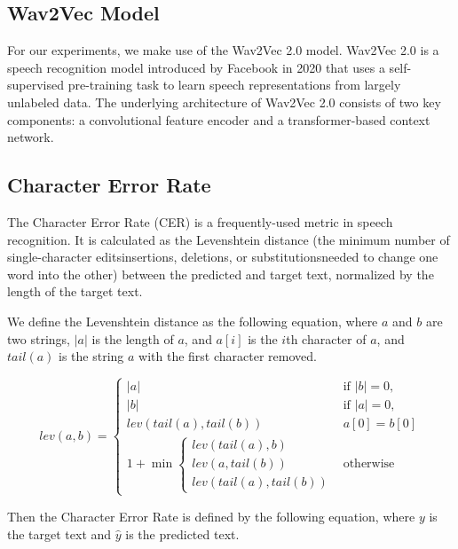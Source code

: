 \documentclass[11pt,a4paper]{article}
\begin{document}
\subsection{Wav2Vec Model}

For our experiments, we make use of the Wav2Vec 2.0 \cite{baevski2020wav2vec}
model. Wav2Vec 2.0 is a speech recognition model introduced by Facebook in 2020
that uses a self-supervised pre-training task to learn speech representations
from largely unlabeled data. The underlying architecture of Wav2Vec 2.0 consists
of two key components: a convolutional feature encoder and a transformer-based
context network.

\subsection{Character Error Rate}

The Character Error Rate (CER) is a frequently-used metric in speech
recognition. It is calculated as the Levenshtein distance (the minimum number of
single-character edits\textemdash insertions, deletions, or
substitutions\textemdash needed to change one word into the other) between the
predicted and target text, normalized by the length of the target text.

We define the Levenshtein distance as the following equation, where $a$ and $b$
are two strings, $|a|$ is the length of $a$, and $a[i]$ is the $i$th character of
$a$, and $tail(a)$ is the string $a$ with the first character removed.

\begin{equation}
  lev(a, b) = \left\{ \begin{array}{ll}
    |a| & \text{if } |b|=0, \\
    |b| & \text{if } |a|=0, \\
    lev(tail(a), tail(b)) & a[0] = b[0]\\
    1 + \min \left\{ \begin{array}{l}
        lev(tail(a), b) \\
        lev(a, tail(b)) \\
        lev(tail(a), tail(b))
      \end{array} \right. & \text{otherwise}
    \end{array} \right.
\end{equation}

Then the Character Error Rate is defined by the following equation, where $y$ is
the target text and $\hat{y}$ is the predicted text.
\end{document}
